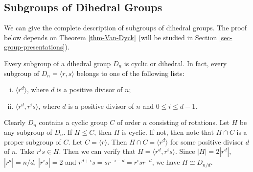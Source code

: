 \subsection{Subgroups of Dihedral Groups}
We can give the complete description of subgroups of dihedral groups. The proof below depends on Theorem \ref{thm-Van-Dyck} (will be studied in Section \ref{sec-group-presentations}).


\begin{theorem} \label{thm-subgrp-of-Dn}
	 Every subgroup of a dihedral group $D_{n}$ is cyclic or dihedral. In fact, every subgroup of $D_n = \langle r,s\rangle$ belongs to one of the following lists:
	 \begin{enumerate}[(i)]
	 	\item $\langle r^d \rangle$, where $d$ is a positive divisor of $n$;
	 	\item $\langle r^d, r^is\rangle$, where $d$ is a positive divisor of $n$ and $0\leq i\leq d-1$.
	 \end{enumerate}
\end{theorem}
\begin{sketch}
	Clearly $D_n$ contains a cyclic group $C$ of order $n$ consisting of rotations.  Let $H$ be any subgroup of $D_n$. If $H  \leq C$,
	then $H$ is cyclic. If not, then note that $H \cap C$ is a proper subgroup of $C$. Let $C = \langle r\rangle$. Then $H\cap C = \langle r^d\rangle$ for some positive divisor $d$ of $n$. Take $r^i s\in H$. Then we can verify that $H = \langle r^d, r^is \rangle$. Since $|H| = 2|r^d|$,   $|r^d| = n/d$, $|r^i s| = 2$ and $r^{d+i}s = sr^{-i-d} = r^{i}sr^{-d}$, we have   $H\cong D_{n/d}$.
\end{sketch}

